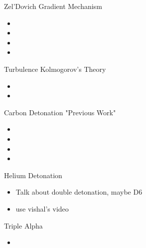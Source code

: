 \documentclass[uncompress,aspectratio=43]{beamer}  %
\begin{document}
\begin{frame}{Zel'Dovich Gradient Mechanism}

\begin{center}
\end{center}
  
\begin{itemize}
\item
\item 
\item 
\item
\end{itemize}

\end{frame}

\begin{frame}{Turbulence}
Kolmogorov's Theory
\begin{center}
\end{center}
  
\begin{itemize}
\item 
\item
\end{itemize}

\end{frame}
\begin{frame}{Carbon Detonation}
	"Previous Work"  
  \begin{itemize}
  \item 
  \item
    \item
      
    \item
\end{itemize}
\end{frame}

\begin{frame}{Helium Detonation}
  \begin{itemize}
	  \item Talk about double detonation, maybe D6
  \item use vishal's video
        
\end{itemize}

\end{frame}

  \begin{frame}{Triple Alpha}
    \begin{itemize}
\item 
\end{itemize}
\end{frame}
\end{document}
